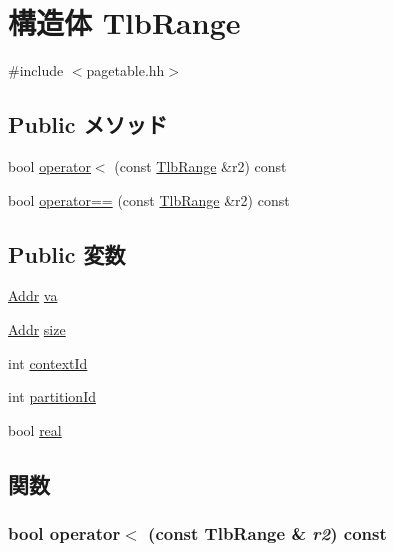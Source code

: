 \hypertarget{structSparcISA_1_1TlbRange}{
\section{構造体 TlbRange}
\label{structSparcISA_1_1TlbRange}
}


{\ttfamily \#include $<$pagetable.hh$>$}\subsection*{Public メソッド}
\begin{DoxyCompactItemize}
\item 
bool \hyperlink{structSparcISA_1_1TlbRange_a4e1fa4f8d831f360cd0aa7ab648efa17}{operator$<$} (const \hyperlink{structSparcISA_1_1TlbRange}{TlbRange} \&r2) const 
\item 
bool \hyperlink{structSparcISA_1_1TlbRange_a411f97b8c5e233b9856d4e5bc0d79902}{operator==} (const \hyperlink{structSparcISA_1_1TlbRange}{TlbRange} \&r2) const 
\end{DoxyCompactItemize}
\subsection*{Public 変数}
\begin{DoxyCompactItemize}
\item 
\hyperlink{base_2types_8hh_af1bb03d6a4ee096394a6749f0a169232}{Addr} \hyperlink{structSparcISA_1_1TlbRange_ad7b7b7a51bb573c0558da2095596bad8}{va}
\item 
\hyperlink{base_2types_8hh_af1bb03d6a4ee096394a6749f0a169232}{Addr} \hyperlink{structSparcISA_1_1TlbRange_a8ce507144b5ef53350af753eafb669f0}{size}
\item 
int \hyperlink{structSparcISA_1_1TlbRange_a5093029b16dfe14cea58c94fea417e01}{contextId}
\item 
int \hyperlink{structSparcISA_1_1TlbRange_ad4aa59c5467d821ec7f86965aa562c09}{partitionId}
\item 
bool \hyperlink{structSparcISA_1_1TlbRange_a3e3020dd28f79c09e9d8a078b0fc8a41}{real}
\end{DoxyCompactItemize}


\subsection{関数}
\hypertarget{structSparcISA_1_1TlbRange_a4e1fa4f8d831f360cd0aa7ab648efa17}{
\subsubsection[{operator$<$}]{\setlength{\rightskip}{0pt plus 5cm}bool operator$<$ (const {\bf TlbRange} \& {\em r2}) const}}
\label{structSparcISA_1_1TlbRange_a4e1fa4f8d831f360cd0aa7ab648efa17}




